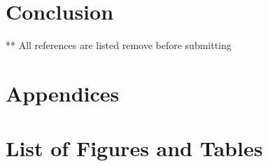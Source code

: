 \documentclass{master_thesis}
\begin{document}
\section*{Conclusion}

\citep{Alsaeedi2020}
\printbibliography
** All references are listed remove before submitting
\section*{Appendices}
\section*{List of Figures and Tables}

\end{document}
